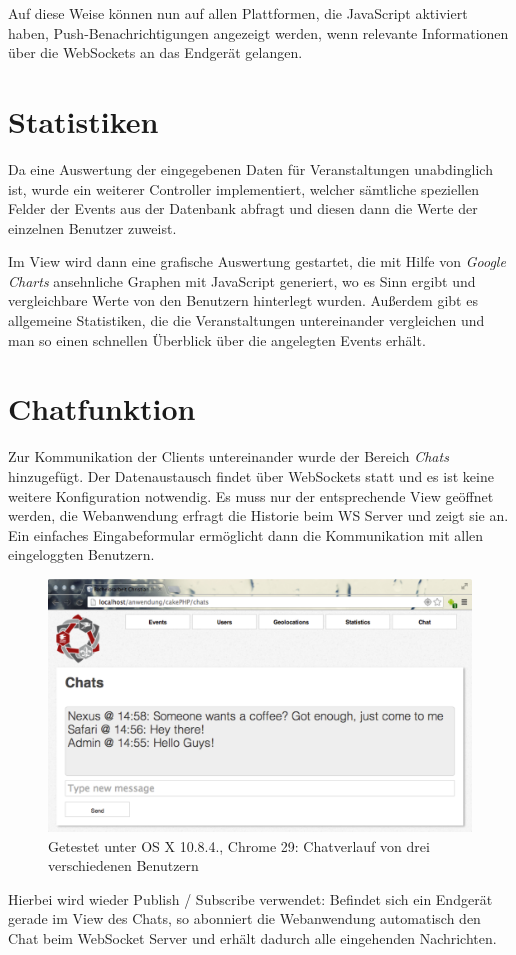 Auf diese Weise können nun auf allen Plattformen, die JavaScript aktiviert haben, Push-Benachrichtigungen angezeigt werden, wenn relevante Informationen über die WebSockets an das Endgerät gelangen.


\section{Statistiken}
Da eine Auswertung der eingegebenen Daten für Veranstaltungen unabdinglich ist, wurde ein weiterer Controller implementiert, welcher sämtliche speziellen Felder der Events aus der Datenbank abfragt und diesen dann die Werte der einzelnen Benutzer zuweist.\par

Im View wird dann eine grafische Auswertung gestartet, die mit Hilfe von \emph{Google Charts} \cite{google:charts} ansehnliche Graphen mit JavaScript generiert, wo es Sinn ergibt und vergleichbare Werte von den Benutzern hinterlegt wurden. Außerdem gibt es allgemeine Statistiken, die die Veranstaltungen untereinander vergleichen und man so einen schnellen Überblick über die angelegten Events erhält.

\section{Chatfunktion}
Zur Kommunikation der Clients untereinander wurde der Bereich \emph{Chats} hinzugefügt. Der Datenaustausch findet über WebSockets statt und es ist keine weitere Konfiguration notwendig. Es muss nur der entsprechende View geöffnet werden, die Webanwendung erfragt die Historie beim WS Server und zeigt sie an. Ein einfaches Eingabeformular ermöglicht dann die Kommunikation mit allen eingeloggten Benutzern.

\begin{figure}[!ht]
	\centering
	\includegraphics[width=15cm]{fig/screenshot_chat}
	\caption[Beispielansicht der Chats]{Getestet unter OS X 10.8.4., Chrome 29: Chatverlauf von drei verschiedenen Benutzern}
\end{figure}

Hierbei wird wieder Publish / Subscribe verwendet: Befindet sich ein Endgerät gerade im View des Chats, so abonniert die Webanwendung automatisch den Chat beim WebSocket Server und erhält dadurch alle eingehenden Nachrichten.

